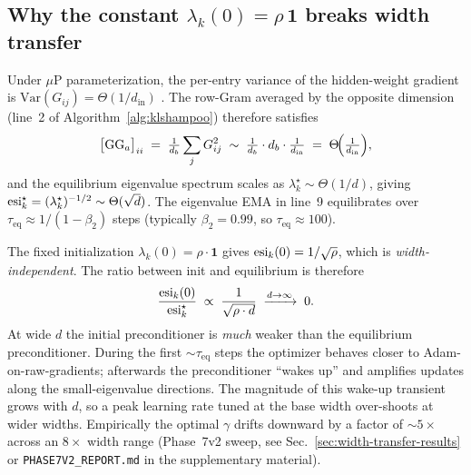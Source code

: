 \subsection{Why the constant $\lambda_k(0)=\rho\,\mathbf{1}$ breaks width transfer}
\label{sec:klshampoo-equilibrium}

Under $\mu$P parameterization, the per-entry variance of the hidden-weight
gradient is $\mathrm{Var}(G_{ij}) = \Theta(1/d_\mathrm{in})$
\citep{yang2021v,qiu2026matrixpreconditioned}. The row-Gram averaged by the
opposite dimension (line~2 of Algorithm~\ref{alg:klshampoo}) therefore
satisfies
\begin{equation}
\bigl[\mathrm{GG}_a\bigr]_{ii}
  \;=\; \tfrac{1}{d_b}\sum_j G_{ij}^2
  \;\sim\; \tfrac{1}{d_b}\cdot d_b \cdot \tfrac{1}{d_\mathrm{in}}
  \;=\; \Theta\!\Bigl(\tfrac{1}{d_\mathrm{in}}\Bigr),
\label{eq:gg-equilibrium}
\end{equation}
and the equilibrium eigenvalue spectrum scales as
$\lambda_k^{\star} \sim \Theta(1/d)$, giving
$\mathrm{esi}_k^{\star} = (\lambda_k^{\star})^{-1/2} \sim \Theta(\sqrt{d})$.
The eigenvalue EMA in line~9 equilibrates over $\tau_{\mathrm{eq}} \approx
1/(1-\beta_2)$ steps (typically $\beta_2=0.99$, so $\tau_\mathrm{eq}\approx
100$).

The fixed initialization $\lambda_k(0)=\rho\cdot\mathbf{1}$ gives
$\mathrm{esi}_k(0) = 1/\sqrt{\rho}$, which is \emph{width-independent}. The ratio
between init and equilibrium is therefore
\begin{equation}
\frac{\mathrm{esi}_k(0)}{\mathrm{esi}_k^{\star}}
  \;\propto\; \frac{1}{\sqrt{\rho\cdot d}}
  \;\xrightarrow{d\to\infty}\;0.
\end{equation}
At wide $d$ the initial preconditioner is \emph{much} weaker than the
equilibrium preconditioner. During the first $\sim\tau_\mathrm{eq}$ steps the
optimizer behaves closer to Adam-on-raw-gradients; afterwards the
preconditioner ``wakes up'' and amplifies updates along the small-eigenvalue
directions. The magnitude of this wake-up transient grows with $d$, so a
peak learning rate tuned at the base width over-shoots at wider widths.
Empirically the optimal $\gamma$ drifts downward by a factor of $\sim 5\times$
across an $8\times$ width range (Phase~7v2 sweep, see
Sec.~\ref{sec:width-transfer-results} or
\texttt{PHASE7V2\_REPORT.md} in the supplementary material).


